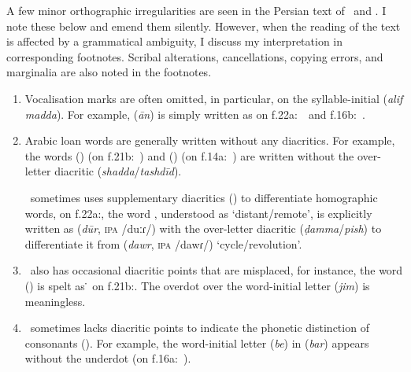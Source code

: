 A few minor orthographic irregularities are seen in the Persian text of \SjA\ and \SjB. I note these below and emend them silently. However, when the reading of the text is affected by a grammatical ambiguity, I discuss my interpretation in corresponding footnotes. Scribal alterations, cancellations, copying errors, and marginalia are also noted in the footnotes.
\begin{enumerate}[topsep=0pt]
    \item Vocalisation marks are often omitted, in particular, on the syllable-initial  (\textit{alif madda}). For example,  (\textit{ān}) is simply written as  on f.\thinspace 22a:~\SjA\ and f.\thinspace 16b:~\SjB.
    
    \item Arabic loan words are generally written without any diacritics. For example, the words   (\muaddil) (on f.\thinspace 21b:~\SjA) and  (\avval) (on f.\thinspace 14a:~\SjB) are written without the over-letter diacritic  (\textit{shadda}/\textit{tashdīd}).
    
    \SjA\ sometimes uses supplementary diacritics (\tashkil) to differentiate homographic words, \eg on f.\thinspace 22a:, the word , understood as `distant/remote', is explicitly written as   (\textit{dūr}, \textsc{ipa} /duːɾ/) with the over-letter diacritic  (\textit{ḍamma}/\textit{pish}) to differentiate it from  (\textit{dawr}, \textsc{ipa} /dawɾ/) `cycle/revolution'.   
    
    \item \SjA\ also has occasional diacritic points that are misplaced, for instance, the word  (\jahat) is spelt as \.{} on f.\thinspace 21b:. The overdot over the word-initial letter  (\textit{jim}) is meaningless. 
    
    \item \SjB\ sometimes lacks diacritic points to indicate the phonetic distinction of consonants (\ijam). For example, the word-initial letter  (\textit{be}) in  (\textit{bar}) appears without the underdot (on f.\thinspace 16a:~\SjB). 
\end{enumerate}


